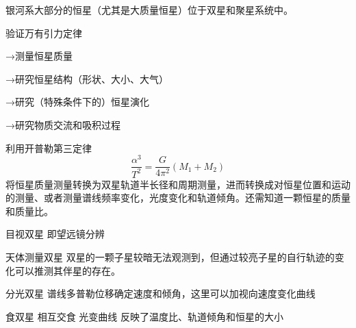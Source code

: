 \documentclass[11pt, a4paper, oneside, onecolumn]{ctexart}
\numberwithin{equation}{subsection}
\begin{document}
银河系大部分的恒星（尤其是大质量恒星）位于双星和聚星系统中。

验证万有引力定律

→测量恒星质量

→研究恒星结构（形状、大小、大气）

→研究（特殊条件下的）恒星演化

→研究物质交流和吸积过程

利用开普勒第三定律
$$
\frac{\alpha^3}{T^2}=\frac{G}{4\pi^2}(M_1+M_2)
$$
将恒星质量测量转换为双星轨道半长径和周期测量，进而转换成对恒星位置和运动的测量、或者测量谱线频率变化，光度变化和轨道倾角。还需知道一颗恒星的质量和质量比。

目视双星 即望远镜分辨

天体测量双星 双星的一颗子星较暗无法观测到，但通过较亮子星的自行轨迹的变化可以推测其伴星的存在。

分光双星 谱线多普勒位移确定速度和倾角，这里可以加视向速度变化曲线 

食双星 相互交食 光变曲线 反映了温度比、轨道倾角和恒星的大小


\printbibliography
\end{document}

